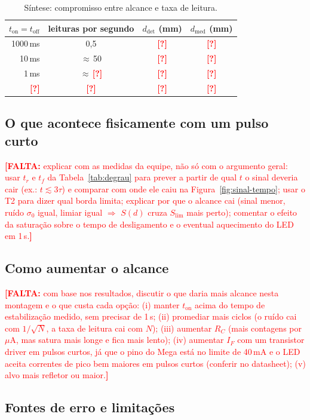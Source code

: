 \documentclass[11pt,a4paper]{article}
\newcommand{\pendente}[1]{\textcolor{red}{\textbf{[FALTA:} #1\textbf{]}}}
\newcommand{\pnd}{\textcolor{red}{\textbf{[?]}}}
\begin{document}
\begin{table}[H]
\centering
\caption{Síntese: compromisso entre alcance e taxa de leitura.}
\label{tab:sintese}
\begin{tabular}{rccc}
\toprule
$t_\text{on} = t_\text{off}$ & leituras por segundo & $d_\text{det}$ (mm) & $d_\text{med}$ (mm) \\
\midrule
1000\,ms & 0,5 & \pnd & \pnd \\
10\,ms   & $\approx$\,50 & \pnd & \pnd \\
1\,ms    & $\approx$\,\pnd & \pnd & \pnd \\
\pnd     & \pnd & \pnd & \pnd \\
\bottomrule
\end{tabular}
\end{table}

\subsection{O que acontece fisicamente com um pulso curto}
\label{sec:disc-fisica}

\pendente{explicar com as medidas da equipe, não só com o argumento geral: usar $t_r$ e $t_f$ da Tabela~\ref{tab:degrau} para prever a partir de qual $t$ o sinal deveria cair (ex.: $t \lesssim 3\tau$) e comparar com onde ele caiu na Figura~\ref{fig:sinal-tempo}; usar o T2 para dizer qual borda limita; explicar por que o alcance cai (sinal menor, ruído $\sigma_0$ igual, limiar igual $\Rightarrow$ $S(d)$ cruza $S_\text{lim}$ mais perto); comentar o efeito da saturação sobre o tempo de desligamento e o eventual aquecimento do LED em 1\,s.}

\subsection{Como aumentar o alcance}

\pendente{com base nos resultados, discutir o que daria mais alcance nesta montagem e o que custa cada opção: (i) manter $t_\text{on}$ acima do tempo de estabilização medido, sem precisar de 1\,s; (ii) promediar mais ciclos (o ruído cai com $1/\sqrt{N}$, a taxa de leitura cai com $N$); (iii) aumentar $R_C$ (mais contagens por $\mu$A, mas satura mais longe e fica mais lento); (iv) aumentar $I_F$ com um transistor driver em pulsos curtos, já que o pino do Mega está no limite de 40\,mA e o LED aceita correntes de pico bem maiores em pulsos curtos (conferir no datasheet); (v) alvo mais refletor ou maior.}

\subsection{Fontes de erro e limitações}
\label{sec:disc-limitacoes}
\end{document}
